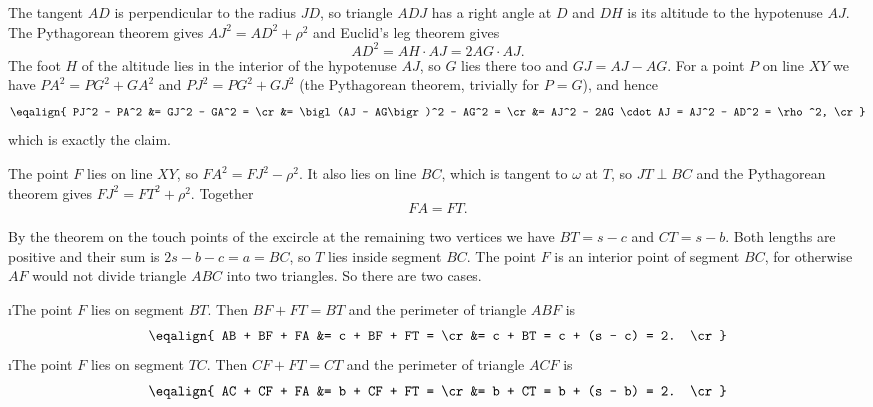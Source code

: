 {    The tangent $AD$ is perpendicular to the radius $JD$, so triangle $ADJ$ has a right angle at $D$ and $DH$ is its altitude to the hypotenuse $AJ$. The Pythagorean theorem gives $AJ^2 = AD^2 + \rho^2$ and Euclid's leg theorem gives
    $$
    AD^2 = AH \cdot AJ = 2AG \cdot AJ.
    $$
    The foot $H$ of the altitude lies in the interior of the hypotenuse $AJ$, so $G$ lies there too and $GJ = AJ - AG$. For a point $P$ on line $XY$ we have $PA^2 = PG^2 + GA^2$ and $PJ^2 = PG^2 + GJ^2$ (the Pythagorean theorem, trivially for $P = G$), and hence
    $$
    \eqalign{
    PJ^2 - PA^2 &= GJ^2 - GA^2 = \cr
    &= \bigl(AJ - AG\bigr)^2 - AG^2 = \cr
    &= AJ^2 - 2AG \cdot AJ = AJ^2 - AD^2 = \rho^2, \cr
    }
    $$
    which is exactly the claim.

    The point $F$ lies on line $XY$, so $FA^2 = FJ^2 - \rho^2$. It also lies on line $BC$, which is tangent to $\omega$ at $T$, so $JT \perp BC$ and the Pythagorean theorem gives $FJ^2 = FT^2 + \rho^2$. Together
    $$
    FA = FT.
    $$

    By the theorem on the touch points of the excircle at the remaining two vertices we have $BT = s - c$ and $CT = s - b$. Both lengths are positive and their sum is $2s - b - c = a = BC$, so $T$ lies inside segment $BC$. The point $F$ is an interior point of segment $BC$, for otherwise $AF$ would not divide triangle $ABC$ into two triangles. So there are two cases.

    \begitems
    \i The point $F$ lies on segment $BT$. Then $BF + FT = BT$ and the perimeter of triangle $ABF$ is
    $$
    \eqalign{
    AB + BF + FA &= c + BF + FT = \cr
    &= c + BT = c + (s - c) = 2. \cr
    }
    $$
    \i The point $F$ lies on segment $TC$. Then $CF + FT = CT$ and the perimeter of triangle $ACF$ is
    $$
    \eqalign{
    AC + CF + FA &= b + CF + FT = \cr
    &= b + CT = b + (s - b) = 2. \cr
    }
    $$
    \enditems
}

